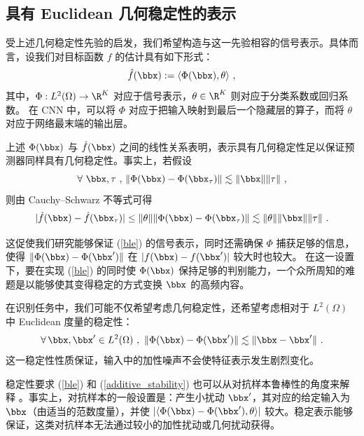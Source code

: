 \subsection{具有 Euclidean 几何稳定性的表示}

受上述几何稳定性先验的启发，我们希望构造与这一先验相容的信号表示。具体而言，设我们对目标函数 $f$ 的估计具有如下形式：
\begin{equation}
    \hat{f}(\bbx) := \langle \Phi(\bbx), \theta \rangle~,
\end{equation}
其中，$\Phi: L^2(\Omega) \to \R^K$ 对应于信号表示，$\theta \in \R^K$ 则对应于分类系数或回归系数。
在 CNN 中，可以将 $\Phi$ 对应于把输入映射到最后一个隐藏层的算子，而将 $\theta$ 对应于网络最末端的输出层。


上述 $\Phi(\bbx)$ 与 $\hat{f}(\bbx)$ 之间的线性关系表明，表示具有几何稳定性足以保证预测器同样具有几何稳定性。事实上，若假设
\begin{equation}
\label{ble}
\forall~\bbx,\tau~,\, \| \Phi(\bbx) - \Phi(\bbx_\tau) \| \lesssim \| \bbx \| \| \tau \|~,    
\end{equation}
则由 Cauchy--Schwarz 不等式可得
$$| \hat{f}(\bbx) - \hat{f}(\bbx_\tau) | \leq \| \theta\| \| \Phi(\bbx) - \Phi(\bbx_\tau) \| \lesssim \| \theta\| \| \bbx \| \| \tau \|~.$$

这促使我们研究能够保证 (\ref{ble}) 的信号表示，同时还需确保 $\Phi$ 捕获足够的信息，使得 $\| \Phi(\bbx) - \Phi(\bbx') \|$ 在 $|f(\bbx) - f(\bbx')| $ 较大时也较大。
在这一设置下，要在实现 (\ref{ble}) 的同时使 $\Phi(\bbx)$ 保持足够的判别能力，一个众所周知的难题是以能够使其变得稳定的方式变换 $\bbx$ 的高频内容。



在识别任务中，我们可能不仅希望考虑几何稳定性，还希望考虑相对于 $L^2(\Omega)$ 中 Euclidean 度量的稳定性：
\begin{equation}
\label{additive_stability}
\forall\, \bbx,\bbx' \in L^2(\Omega)~,~\| \Phi(\bbx) - \Phi(\bbx') \| \lesssim \| \bbx - \bbx' \| ~.
\end{equation}
这一稳定性性质保证，输入中的加性噪声不会使特征表示发生剧烈变化。

稳定性要求 (\ref{ble}) 和 (\ref{additive_stability}) 也可以从对抗样本鲁棒性的角度来解释 \cite{szegedy2013intriguing}。事实上，对抗样本的一般设置是：产生小扰动 $\bbx'$，其对应的给定输入为 $\bbx$（由适当的范数度量），并使 $| \langle \Phi(\bbx) - \Phi(\bbx'), \theta \rangle|$ 较大。稳定表示能够保证，这类对抗样本无法通过较小的加性扰动或几何扰动获得。

